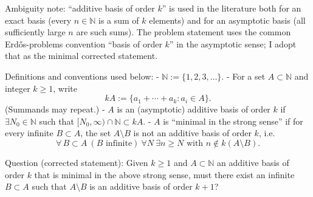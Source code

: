 Ambiguity note: “additive basis of order $k$” is used in the literature both for an exact basis (every $n\in\mathbb N$ is a sum of $k$ elements) and for an asymptotic basis (all sufficiently large $n$ are such sums). The problem statement uses the common Erd\H{o}s-problems convention “basis of order $k$” in the asymptotic sense; I adopt that as the minimal corrected statement.

Definitions and conventions used below:
- $\mathbb N:=\{1,2,3,\dots\}$.
- For a set $A\subset\mathbb N$ and integer $k\ge 1$, write
  \[kA:=\{a_1+\cdots+a_k: a_i\in A\}.\]
  (Summands may repeat.)
- $A$ is an (asymptotic) additive basis of order $k$ if $\exists N_0\in\mathbb N$ such that $[N_0,\infty)\cap\mathbb N\subset kA$.
- $A$ is “minimal in the strong sense” if for every infinite $B\subset A$, the set $A\setminus B$ is not an additive basis of order $k$, i.e.
  \[\forall\, B\subset A\ (B\text{ infinite})\ \forall N\ \exists n\ge N\text{ with }n\notin k(A\setminus B).\]

Question (corrected statement): Given $k\ge 1$ and $A\subset\mathbb N$ an additive basis of order $k$ that is minimal in the above strong sense, must there exist an infinite $B\subset A$ such that $A\setminus B$ is an additive basis of order $k+1$?
